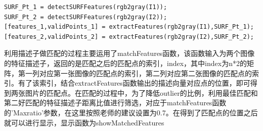 \begin{lstlisting}
SURF_Pt_1 = detectSURFFeatures(rgb2gray(I1));
SURF_Pt_2 = detectSURFFeatures(rgb2gray(I2));
[features_1,validPoints_1] = extractFeatures(rgb2gray(I1),SURF_Pt_1);
[features_2,validPoints_2] = extractFeatures(rgb2gray(I2),SURF_Pt_2);
\end{lstlisting}

利用描述子做匹配的过程主要运用了matchFeatures函数，该函数输入为两个图像的特征描述子，返回的是匹配之后的匹配点的索引，index，其中index为n*2的矩阵，第一列对应第一张图像的匹配点的索引，第二列对应第二张图像的匹配点的索引。有了该索引，结合extractFeatures函数输出的描述向量对应点的位置，即可得到两张图片的匹配点。在匹配的过程中，为了降低outlier的比例，利用最佳匹配和第二好匹配的特征描述子距离比值进行筛选，对应于matchFeatures函数的’Maxratio’参数，在这里按照老师的建议设置为0.7。在得到了匹配点的位置之后就可以进行显示，显示函数为showMatchedFeatures